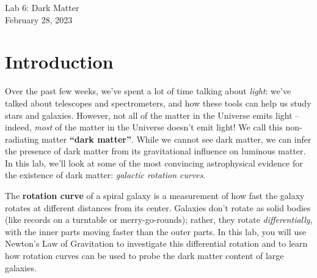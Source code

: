 \documentclass[11pt]{article}%
\begin{document}
\begin{center}
\huge{Lab 6: Dark Matter}\\ \medskip \Large{February 28, 2023}
\end{center}

\section{Introduction}

\noindent
Over the past few weeks, we've spent a lot of time talking about \emph{light}: we've talked about telescopes and spectrometers, and how these tools can help us study stars and galaxies. However, not all of the matter in the Universe emits light -- indeed, \emph{most} of the matter in the Universe doesn't emit light! We call this non-radiating matter \textbf{``dark matter''}. While we cannot see dark matter, we can infer the presence of dark matter from its gravitational influence on luminous matter. In this lab, we'll look at some of the most convincing astrophysical evidence for the existence of dark matter: \textit{galactic rotation curves}.

\medskip \noindent
The \textbf{rotation curve} of a spiral galaxy is a measurement of how fast the galaxy rotates at different distances from its center.  Galaxies don't rotate as solid bodies (like records on a turntable or merry-go-rounds); rather, they rotate \textit{differentially}, with the inner parts moving faster than the outer parts. In this lab, you will use Newton's Law of Gravitation to investigate this differential rotation and to learn how rotation curves can be used to probe the dark matter content of large galaxies.

\end{document}
